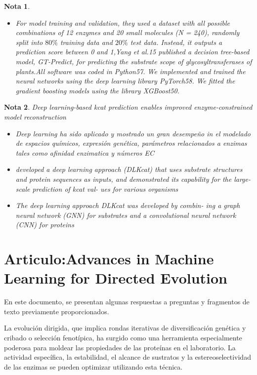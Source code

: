 \documentclass[12pt]{article}
\newtheorem{Note}{Nota}%
\begin{document}
\begin{Note}
\begin{itemize}
\item For model training and validation, they used a dataset with all possible combinations of 12 enzymes and 20 small molecules
(N = 240), randomly split into $80\%$ training data and $20\%$ test data. Instead, it outputs a prediction score between 0 and 1,Yang et al.15 published a decision tree-based model, GT-Predict, for predicting the substrate scope of glycosyltransferases of plants.All software was coded in Python57. We implemented and trained the neural networks using the deep learning library PyTorch58. We fitted the gradient boosting models using the library XGBoost50.
\end{itemize}

\end{Note}



\begin{Note}
Deep learning-based kcat prediction enables improved enzyme-constrained model reconstruction

\begin{itemize}


\item Deep learning ha sido aplicado y mostrado un gran desempeño in el modelado de espacios químicos, expresión genética, parámetros relacionados a enzimas tales como afinidad enzimatica y números EC 

\item developed a deep learning approach (DLKcat) that uses substrate structures and protein sequences as inputs, and demonstrated its capability for the large-scale prediction of kcat val- ues for various organisms


\item The deep learning approach DLKcat was developed by combin- ing a graph neural network (GNN) for substrates and a convolutional neural network (CNN) for proteins
\end{itemize}


\end{Note}

\section{Articulo:Advances in Machine Learning for Directed Evolution }


En este documento, se presentan algunas respuestas a preguntas y fragmentos de texto previamente proporcionados.

La evolución dirigida, que implica rondas iterativas de diversificación genética y cribado o selección fenotípica, ha surgido como una herramienta especialmente poderosa para moldear las propiedades de las proteínas en el laboratorio. La actividad específica, la estabilidad, el alcance de sustratos y la estereoselectividad de las enzimas se pueden optimizar utilizando esta técnica.
\end{document}
